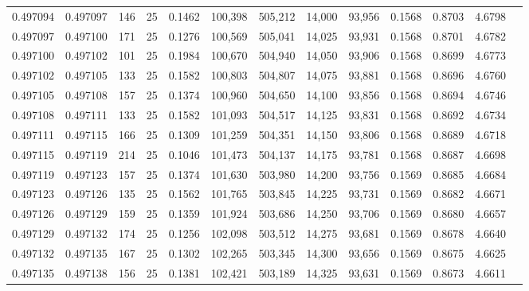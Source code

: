 \begin{tabular}{rrrrrrrrrrrrr}
0.497094 & 0.497097 & 146 &  25 &                                     0.1462 & 100,398 & 505,212 &  14,000 &  93,956 & 0.1568 & 0.8703 & 4.6798 \\
0.497097 & 0.497100 & 171 &  25 &                                     0.1276 & 100,569 & 505,041 &  14,025 &  93,931 & 0.1568 & 0.8701 & 4.6782 \\
0.497100 & 0.497102 & 101 &  25 &                                     0.1984 & 100,670 & 504,940 &  14,050 &  93,906 & 0.1568 & 0.8699 & 4.6773 \\
0.497102 & 0.497105 & 133 &  25 &                                     0.1582 & 100,803 & 504,807 &  14,075 &  93,881 & 0.1568 & 0.8696 & 4.6760 \\
0.497105 & 0.497108 & 157 &  25 &                                     0.1374 & 100,960 & 504,650 &  14,100 &  93,856 & 0.1568 & 0.8694 & 4.6746 \\
0.497108 & 0.497111 & 133 &  25 &                                     0.1582 & 101,093 & 504,517 &  14,125 &  93,831 & 0.1568 & 0.8692 & 4.6734 \\
0.497111 & 0.497115 & 166 &  25 &                                     0.1309 & 101,259 & 504,351 &  14,150 &  93,806 & 0.1568 & 0.8689 & 4.6718 \\
0.497115 & 0.497119 & 214 &  25 &                                     0.1046 & 101,473 & 504,137 &  14,175 &  93,781 & 0.1568 & 0.8687 & 4.6698 \\
0.497119 & 0.497123 & 157 &  25 &                                     0.1374 & 101,630 & 503,980 &  14,200 &  93,756 & 0.1569 & 0.8685 & 4.6684 \\
0.497123 & 0.497126 & 135 &  25 &                                     0.1562 & 101,765 & 503,845 &  14,225 &  93,731 & 0.1569 & 0.8682 & 4.6671 \\
0.497126 & 0.497129 & 159 &  25 &                                     0.1359 & 101,924 & 503,686 &  14,250 &  93,706 & 0.1569 & 0.8680 & 4.6657 \\
0.497129 & 0.497132 & 174 &  25 &                                     0.1256 & 102,098 & 503,512 &  14,275 &  93,681 & 0.1569 & 0.8678 & 4.6640 \\
0.497132 & 0.497135 & 167 &  25 &                                     0.1302 & 102,265 & 503,345 &  14,300 &  93,656 & 0.1569 & 0.8675 & 4.6625 \\
0.497135 & 0.497138 & 156 &  25 &                                     0.1381 & 102,421 & 503,189 &  14,325 &  93,631 & 0.1569 & 0.8673 & 4.6611 \\

\end{tabular}
